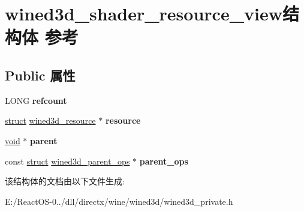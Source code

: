 \hypertarget{structwined3d__shader__resource__view}{}\section{wined3d\+\_\+shader\+\_\+resource\+\_\+view结构体 参考}
\label{structwined3d__shader__resource__view}
\subsection*{Public 属性}
\begin{DoxyCompactItemize}
\item 
\mbox{\label{structwined3d__shader__resource__view_ae5d124d6339ad5dbb5359313f08ee766}} 
L\+O\+NG {\bfseries refcount}
\item 
\mbox{\label{structwined3d__shader__resource__view_a49a7642759daf68fdc21115d4ff2caf4}} 
\hyperlink{interfacestruct}{struct} \hyperlink{structwined3d__resource}{wined3d\+\_\+resource} $\ast$ {\bfseries resource}
\item 
\mbox{\label{structwined3d__shader__resource__view_a3b6b819daf310221b440028c1573794c}} 
\hyperlink{interfacevoid}{void} $\ast$ {\bfseries parent}
\item 
\mbox{\label{structwined3d__shader__resource__view_a8d9a0c88c73b18970cfb090590cb293e}} 
const \hyperlink{interfacestruct}{struct} \hyperlink{structwined3d__parent__ops}{wined3d\+\_\+parent\+\_\+ops} $\ast$ {\bfseries parent\+\_\+ops}
\end{DoxyCompactItemize}


该结构体的文档由以下文件生成\+:\begin{DoxyCompactItemize}
\item 
E\+:/\+React\+O\+S-\/0../dll/directx/wine/wined3d/wined3d\+\_\+private.\+h\end{DoxyCompactItemize}
